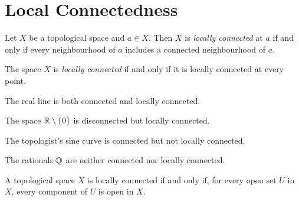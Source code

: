 \section{Local Connectedness}

\begin{definition}
    Let $X$ be a topological space and $a \in X$. Then $X$ is \emph{locally
    connected} at $a$ if and only if every neighbourhood of $a$ includes a
    connected neighbourhood of $a$.

    The space $X$ is \emph{locally connected} if and only if it is locally
    connected at every point.
\end{definition}

\begin{example}
    The real line is both connected and locally connected.
\end{example}

\begin{example}
    The space $\mathbb{R} \setminus \{0\}$ is disconnected but locally connected.
\end{example}

\begin{example}
    The topologist's sine curve is connected but not locally connected.
\end{example}

\begin{example}
    The rationals $\mathbb{Q}$ are neither connected nor locally connected.
\end{example}

\begin{theorem}
    \label{theorem:open_component_locally_connected}
    A topological space $X$ is locally connected if and only if, for every
    open set $U$ in $X$, every component of $U$ is open in $X$.
\end{theorem}

